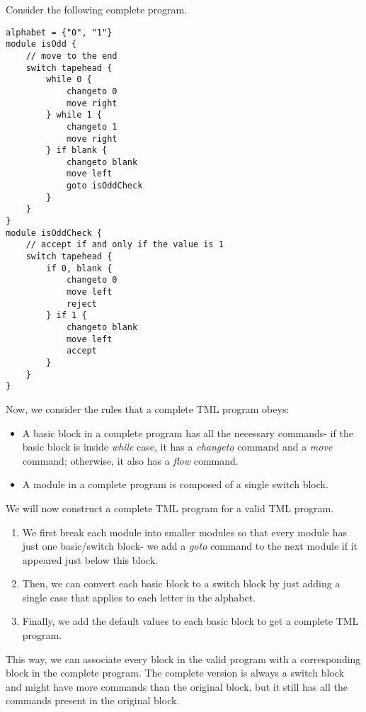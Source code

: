 Consider the following complete program.
\begin{lstlisting}[language=TML]
alphabet = {"0", "1"}
module isOdd {
    // move to the end
    switch tapehead {
        while 0 {
            changeto 0
            move right
        } while 1 {
            changeto 1
            move right
        } if blank {
            changeto blank
            move left
            goto isOddCheck
        }
    }
}
module isOddCheck {
    // accept if and only if the value is 1
    switch tapehead {
        if 0, blank {
            changeto 0
            move left
            reject
        } if 1 {
            changeto blank
            move left
            accept
        }
    }
}
\end{lstlisting}
Now, we consider the rules that a complete TML program obeys:
\begin{itemize}
    \item A basic block in a complete program has all the necessary commands- if the basic block is inside \textit{while} case, it has a \textit{changeto} command and a \textit{move} command; otherwise, it also has a \textit{flow} command.
    \item A module in a complete program is composed of a single switch block.
\end{itemize}

We will now construct a complete TML program for a valid TML program.
\begin{enumerate}
    \item We first break each module into smaller modules so that every module has just one basic/switch block- we add a \textit{goto} command to the next module if it appeared just below this block.
    \item Then, we can convert each basic block to a switch block by just adding a single case that applies to each letter in the alphabet.
    \item Finally, we add the default values to each basic block to get a complete TML program.
\end{enumerate}
This way, we can associate every block in the valid program with a corresponding block in the complete program. The complete version is always a switch block and might have more commands than the original block, but it still has all the commands present in the original block. 

